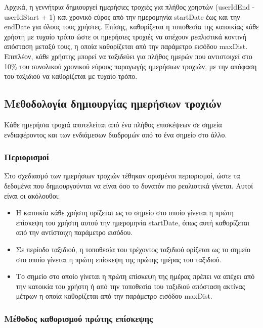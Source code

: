 Αρχικά, η γεννήτρια δημιουργεί ημερήσιες τροχιές για πλήθος χρηστών (userIdEnd - userIdStart + 1) και χρονικό εύρος από την ημερομηνία startDate έως και την endDate 
για όλους τους χρήστες. Επίσης, καθορίζεται η τοποθεσία της κατοικίας κάθε χρήστη με τυχαίο τρόπο ώστε οι ημερήσιες τροχιές να απέχουν ρεαλιστικά κοντινή απόσταση 
μεταξύ τους, η οποία καθορίζεται από την παράμετρο εισόδου maxDist. Επιπλέον, κάθε χρήστης μπορεί να ταξιδεύει για πλήθος ημερών που αντιστοιχεί στο 10\% του 
συνολικού χρονικού εύρους παραγωγής ημερήσιων τροχιών, με την απόφαση του ταξιδιού να καθορίζεται με τυχαίο τρόπο. 

\subsection{Μεθοδολογία δημιουργίας ημερήσιων τροχιών}

Κάθε ημερήσια τροχιά αποτελείται από ένα πλήθος επισκέψεων σε σημεία ενδιαφέροντος και των ενδιάμεσων διαδρομών από το ένα σημείο στο άλλο. 

\subsubsection{Περιορισμοί}

Στο σχεδιασμό των ημερήσιων τροχιών τέθηκαν ορισμένοι περιορισμοί, ώστε τα δεδομένα που δημιουργούνται να είναι όσο το δυνατόν πιο ρεαλιστικά γίνεται. Αυτοί είναι 
οι ακόλουθοι:

\begin{itemize}
 \item Η κατοικία κάθε χρήστη ορίζεται ως το σημείο στο οποίο γίνεται η πρώτη επίσκεψη του χρήστη αυτού την ημερομηνία startDate, όπως αυτή καθορίζεται από 
 την αντίστοιχη παράμετρο εισόδου.
 \item Σε περίοδο ταξιδιού, η τοποθεσία του τρέχοντος ταξιδιού ορίζεται ως το σημείο στο οποίο γίνεται η πρώτη επίσκεψη της πρώτης ημέρας του ταξιδιού. 
 \item Το σημείο στο οποίο γίνεται η πρώτη επίσκεψη της ημέρας πρέπει να απέχει από την κατοικία του χρήστη ή από την τοποθεσία του ταξιδιού απόσταση ακτίνας μέτρων 
 η οποία καθορίζεται από την παράμετρο εισόδου maxDist.
\end{itemize}

\subsubsection{Μέθοδος καθορισμού πρώτης επίσκεψης}

